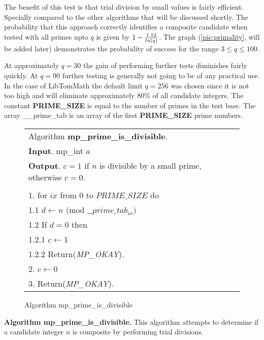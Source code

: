 \documentclass[b5paper]{book}
\begin{document}
The benefit of this test is that trial division by small values is fairly efficient.  Specially compared to the other algorithms that will be
discussed shortly.  The probability that this approach correctly identifies a composite candidate when tested with all primes upto $q$ is given by
$1 - {1.12 \over ln(q)}$.  The graph (\ref{pic:primality}, will be added later) demonstrates the probability of success for the range 
$3 \le q \le 100$.  

At approximately $q = 30$ the gain of performing further tests diminishes fairly quickly.  At $q = 90$ further testing is generally not going to 
be of any practical use.  In the case of LibTomMath the default limit $q = 256$ was chosen since it is not too high and will eliminate 
approximately $80\%$ of all candidate integers.  The constant \textbf{PRIME\_SIZE} is equal to the number of primes in the test base.  The 
array \_\_prime\_tab is an array of the first \textbf{PRIME\_SIZE} prime numbers.  

\begin{figure}[!here]
\begin{small}
\begin{center}
\begin{tabular}{l}
\hline Algorithm \textbf{mp\_prime\_is\_divisible}. \\
\textbf{Input}.   mp\_int $a$ \\
\textbf{Output}.  $c = 1$ if $n$ is divisible by a small prime, otherwise $c = 0$.  \\
\hline \\
1.  for $ix$ from $0$ to $PRIME\_SIZE$ do \\
\hspace{3mm}1.1  $d \leftarrow n \mbox{ (mod }\_\_prime\_tab_{ix}\mbox{)}$ \\
\hspace{3mm}1.2  If $d = 0$ then \\
\hspace{6mm}1.2.1  $c \leftarrow 1$ \\
\hspace{6mm}1.2.2  Return(\textit{MP\_OKAY}). \\
2.  $c \leftarrow 0$ \\
3.  Return(\textit{MP\_OKAY}). \\
\hline
\end{tabular}
\end{center}
\end{small}
\caption{Algorithm mp\_prime\_is\_divisible}
\end{figure}
\textbf{Algorithm mp\_prime\_is\_divisible.}
This algorithm attempts to determine if a candidate integer $n$ is composite by performing trial divisions.  
\end{document}
